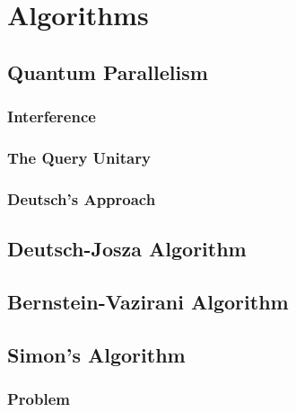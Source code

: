 \chapter{Algorithms} %

    \section{Quantum Parallelism} %

        \subsection{Interference} %

        \subsection{The Query Unitary} %

        \subsection{Deutsch's Approach} %

    \section{Deutsch-Josza Algorithm} %

    \section{Bernstein-Vazirani Algorithm} %

    \section{Simon's Algorithm} %

        \subsection{Problem} %

